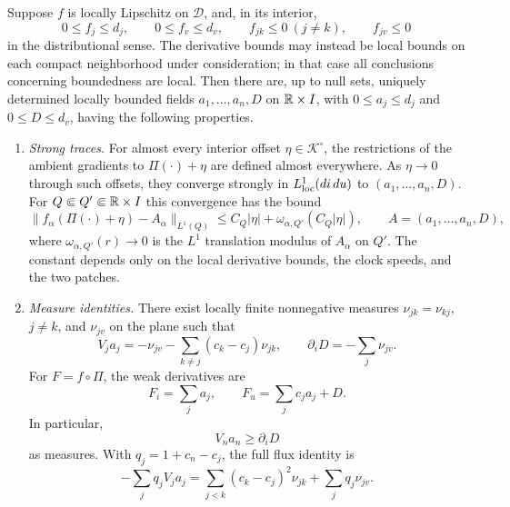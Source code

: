 \begin{theorem}\label{thm:characteristic-trace}
Suppose $f$ is locally Lipschitz on $\mathcal D$, and, in its interior,
\[
 0\le f_j\le d_j,\qquad 0\le f_v\le d_v,
 \qquad f_{jk}\le0\ (j\ne k),\qquad f_{jv}\le0
\]
in the distributional sense.  The derivative bounds may instead be local
bounds on each compact neighborhood under consideration; in that
case all conclusions concerning boundedness are local.  Then there
are, up to null sets, uniquely determined locally bounded fields $a_1,\ldots,a_n,D$ on
$\mathbb R\times I$, with $0\le a_j\le d_j$ and $0\le D\le d_v$, having the
following properties.

\begin{enumerate}
\item \emph{Strong traces.} For almost every interior offset $\eta\in\mathcal K^\circ$, the
restrictions of the ambient gradients to $\Pi(\cdot)+\eta$ are defined
almost everywhere.  As $\eta\to0$ through such offsets, they converge
strongly in $L^1_{\rm loc}(di\,du)$ to $(a_1,\ldots,a_n,D)$.
For $Q\Subset Q'\Subset\mathbb R\times I$ this convergence has the bound
\begin{equation}\label{eq:trace-quantitative-slices}
 \|f_\alpha(\Pi(\cdot)+\eta)-A_\alpha\|_{L^1(Q)}
 \le C_Q|\eta|+\omega_{\alpha,Q'}(C_Q|\eta|),
 \qquad A=(a_1,\ldots,a_n,D),
\end{equation}
where $\omega_{\alpha,Q'}(r)\to0$ is the $L^1$ translation modulus of
$A_\alpha$ on $Q'$.  The constant depends only on the local derivative
bounds, the clock speeds, and the two patches.

\item \emph{Measure identities.} There exist locally finite nonnegative measures
$\nu_{jk}=\nu_{kj}$, $j\ne k$, and $\nu_{jv}$ on the plane such that
\begin{equation}\label{eq:trace-mixed-measures}
 V_j a_j=-\nu_{jv}-\sum_{k\ne j}(c_k-c_j)\nu_{jk},
 \qquad \partial_iD=-\sum_j\nu_{jv}.
\end{equation}
For $F=f\circ\Pi$, the weak derivatives are
\begin{equation}\label{eq:trace-plane-derivatives}
 F_i=\sum_j a_j,\qquad F_u=\sum_j c_ja_j+D.
\end{equation}
In particular,
\begin{equation}\label{eq:trace-distribution-inequality}
 V_n a_n\ge\partial_iD
\end{equation}
as measures.  With $q_j=1+c_n-c_j$, the full flux identity is
\begin{equation}\label{eq:trace-measure-flux}
 -\sum_jq_jV_ja_j
 =\sum_{j<k}(c_k-c_j)^2\nu_{jk}+\sum_jq_j\nu_{jv}.
\end{equation}


\end{enumerate}
\end{theorem}
